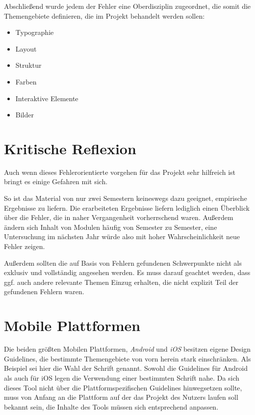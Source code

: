 Abschließend wurde jedem der Fehler eine Oberdisziplin zugeordnet, die somit die Themengebiete definieren, die im Projekt behandelt werden sollen:

\begin{itemize}
	\item Typographie
	\item Layout
	\item Struktur
	\item Farben
	\item Interaktive Elemente
	\item Bilder
\end{itemize}



\section{Kritische Reflexion}
Auch wenn dieses Fehlerorientierte vorgehen für das Projekt sehr hilfreich ist bringt es einige Gefahren mit sich.

So ist das Material von nur zwei Semestern keineswegs dazu geeignet, empirische Ergebnisse zu liefern. Die erarbeiteten Ergebnisse liefern lediglich einen Überblick über die Fehler, die in naher Vergangenheit vorherrschend waren. Außerdem ändern sich Inhalt von Modulen häufig von Semester zu Semester, eine Untersuchung im nächsten Jahr würde also mit hoher Wahrscheinlichkeit neue Fehler zeigen.

Außerdem sollten die auf Basis von Fehlern gefundenen Schwerpunkte nicht als exklusiv und vollständig angesehen werden. Es muss darauf geachtet werden, dass ggf. auch andere relevante Themen Einzug erhalten, die nicht explizit Teil der gefundenen Fehlern waren.


\section{Mobile Plattformen}
Die beiden größten Mobilen Plattformen, \textit{Android} und \textit{iOS} besitzen eigene Design Guidelines, die bestimmte Themengebiete von vorn herein stark einschränken.
Als Beispiel sei hier die Wahl der Schrift genannt. Sowohl die Guidelines für Android als auch für iOS legen die Verwendung einer bestimmten Schrift nahe.
Da sich dieses Tool nicht über die Plattformspezifischen Guidelines hinwegsetzen sollte, muss von Anfang an die Plattform  auf der das Projekt des Nutzers laufen soll bekannt sein, die Inhalte des Tools müssen sich entsprechend anpassen.


\clearpage
